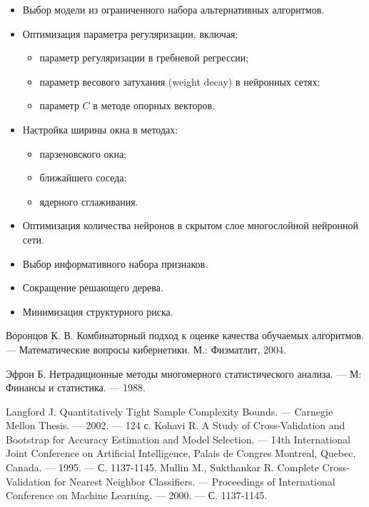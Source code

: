\begin{itemize}
    \item Выбор модели из ограниченного набора альтернативных алгоритмов.
    \item Оптимизация параметра регуляризации, включая:
    \begin{itemize}
        \item параметр регуляризации в гребневой регрессии;
        \item параметр весового затухания (weight decay) в нейронных сетях;
        \item параметр \( C \) в методе опорных векторов.
    \end{itemize}
    \item Настройка ширины окна в методах:
    \begin{itemize}
        \item парзеновского окна;
        \item ближайшего соседа;
        \item ядерного сглаживания.
    \end{itemize}
    \item Оптимизация количества нейронов в скрытом слое многослойной нейронной сети.
    \item Выбор информативного набора признаков.
    \item Сокращение решающего дерева.
    \item Минимизация структурного риска.
\end{itemize}

\begin{thebibliography}{5}

Воронцов К. В. Комбинаторный подход к оценке качества обучаемых алгоритмов. — Математические вопросы кибернетики. М.: Физматлит, 2004.

Эфрон Б. Нетрадиционные методы многомерного статистического анализа. — М: Финансы и статистика. — 1988.

Langford J. Quantitatively Tight Sample Complexity Bounds. — Carnegie Mellon Thesis. — 2002. — 124 с.
Kohavi R. A Study of Cross-Validation and Bootstrap for Accuracy Estimation and Model Selection. — 14th International Joint Conference on Artificial Intelligence, Palais de Congres Montreal, Quebec, Canada. — 1995. — С. 1137-1145.
Mullin M., Sukthankar R. Complete Cross-Validation for Nearest Neighbor Classifiers. — Proceedings of International Conference on Machine Learning. — 2000. — С. 1137-1145.

\end{thebibliography}

